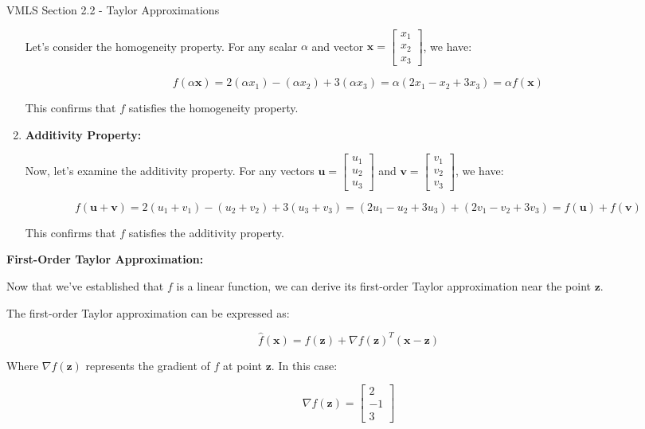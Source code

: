 \begin{notes}{VMLS Section 2.2 - Taylor Approximations}
\begin{highlight}
\begin{enumerate}
            Let's consider the homogeneity property. For any scalar \(\alpha\) and vector \(\mathbf{x} = \begin{bmatrix} x_1 \\ x_2 \\ x_3 \end{bmatrix}\), we have:
            
            \[f(\alpha\mathbf{x}) = 2(\alpha x_1) - (\alpha x_2) + 3(\alpha x_3) = \alpha(2x_1 - x_2 + 3x_3) = \alpha f(\mathbf{x})\]
            
            This confirms that \(f\) satisfies the homogeneity property.
            
            \item \textbf{Additivity Property:}
            
            Now, let's examine the additivity property. For any vectors \(\mathbf{u} = \begin{bmatrix} u_1 \\ u_2 \\ u_3 \end{bmatrix}\) and \(\mathbf{v} = \begin{bmatrix} v_1 \\ v_2 \\ v_3 \end{bmatrix}\), we have:
            
            \[f(\mathbf{u} + \mathbf{v}) = 2(u_1 + v_1) - (u_2 + v_2) + 3(u_3 + v_3) = (2u_1 - u_2 + 3u_3) + (2v_1 - v_2 + 3v_3) = f(\mathbf{u}) + f(\mathbf{v})\]
            
            This confirms that \(f\) satisfies the additivity property.
        \end{enumerate}
        
        \textbf{First-Order Taylor Approximation:} \vspace*{1em}
        
        Now that we've established that \(f\) is a linear function, we can derive its first-order Taylor approximation near the point \(\mathbf{z}\).
        
        The first-order Taylor approximation can be expressed as:
        
        \[\hat{f}(\mathbf{x}) = f(\mathbf{z}) + \nabla f(\mathbf{z})^T (\mathbf{x} - \mathbf{z})\]
        
        Where \(\nabla f(\mathbf{z})\) represents the gradient of \(f\) at point \(\mathbf{z}\). In this case:
        
        \[\nabla f(\mathbf{z}) = \begin{bmatrix} 2 \\ -1 \\ 3 \end{bmatrix}\]
        

\end{highlight}
\end{notes}
